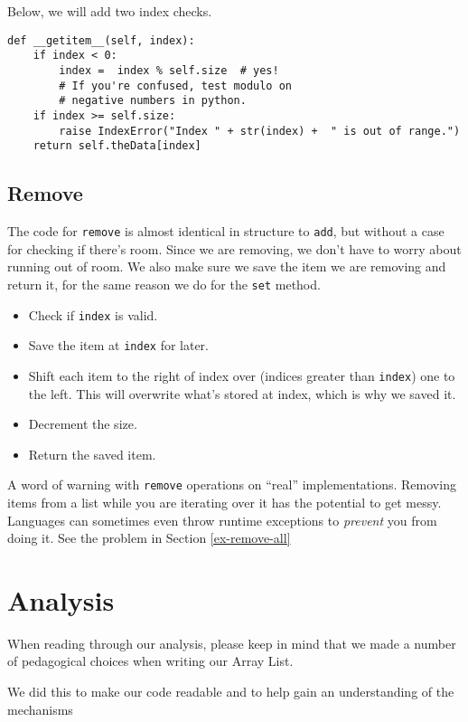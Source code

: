 Below, we will add two index checks.

\begin{verbatim}
def __getitem__(self, index):
	if index < 0: 
		index =  index % self.size  # yes! 
		# If you're confused, test modulo on 
		# negative numbers in python.
	if index >= self.size:
		raise IndexError("Index " + str(index) +  " is out of range.")       
	return self.theData[index]
\end{verbatim}


\subsection{Remove}


The code for \texttt{remove} is almost identical in structure to \texttt{add}, but without a case for checking if there's room.  Since we are removing, we don't have to worry about running out of room.  We also make sure we save the item we are removing and return it, for the same reason we do for the \texttt{set} method.
\begin{itemize}
	\item Check if \texttt{index} is valid.
	\item Save the item at \texttt{index} for later.
	\item Shift each item to the right of index over (indices greater than \texttt{index}) one to the left.  This will overwrite what's stored at index, which is why we saved it. 
	\item Decrement the size.
	\item Return the saved item.
	
\end{itemize}


A word of warning with \texttt{remove} operations on  ``real'' implementations.  Removing items from a list while you are iterating over it has the potential to get messy.  Languages can sometimes even throw runtime exceptions to \textit{prevent} you from doing it.  See the problem in Section \ref{ex-remove-all}

\section{Analysis}

When reading through our analysis, please keep in mind that we made a number of pedagogical choices when writing our Array List. 

We did this to make our code readable and to help gain an understanding of the mechanisms 

